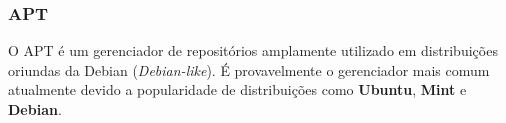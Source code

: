 \subsubsection{APT} %
\label{subs:apt}

O APT é um gerenciador de repositórios  amplamente utilizado em distribuições oriundas da Debian (\textit{Debian-like}). É provavelmente o gerenciador mais comum atualmente devido a popularidade de distribuições como \textbf{Ubuntu}, \textbf{Mint} e \textbf{Debian}.

\label{subs:sobre_o_apt_cache}


\label{subs:funcionalidade_do_apt_cache}




